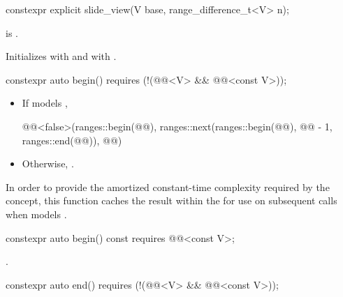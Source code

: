 %
\begin{itemdecl}
constexpr explicit slide_view(V base, range_difference_t<V> n);
\end{itemdecl}

\begin{itemdescr}
\pnum
\expects
{} is .

\pnum
\effects
Initializes  with  and
 with .
\end{itemdescr}

%
\begin{itemdecl}
constexpr auto begin()
  requires (!(@@<V> && @@<const V>));
\end{itemdecl}

\begin{itemdescr}
\pnum
\returns
\begin{itemize}
\item
If  models ,
\begin{codeblock}
@@<false>(ranges::begin(@@),
                ranges::next(ranges::begin(@@), @@ - 1, ranges::end(@@)), @@)
\end{codeblock}
\item
Otherwise, .
\end{itemize}

\pnum
\remarks
In order to provide the amortized constant-time complexity
required by the  concept,
this function caches the result within the 
for use on subsequent calls
when  models .
\end{itemdescr}

%
\begin{itemdecl}
constexpr auto begin() const requires @@<const V>;
\end{itemdecl}

\begin{itemdescr}
\pnum
\returns
{}.
\end{itemdescr}

%
\begin{itemdecl}
constexpr auto end()
  requires (!(@@<V> && @@<const V>));
\end{itemdecl}


